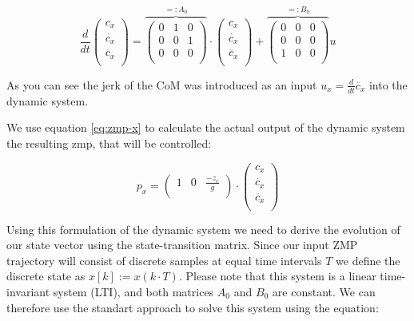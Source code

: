 \documentclass[english,ngerman]{KITreprt}
\begin{document}
\begin{equation} \label{eq:dyn-system}
\frac{d}{dt} \left(\begin{array}{c}
c_x \\
\dot{c_x} \\
\ddot{c_x} \\
\end{array} \right)
=
\overbrace{
\left(\begin{array}{ccc}
0 & 1 & 0\\
0 & 0 & 1 \\
0 & 0 & 0 \\
\end{array}\right)
}^{ =: A_0}
\cdot
\left(\begin{array}{c}
c_x \\
\dot{c_x} \\
\ddot{c_x} \\
\end{array}\right)
+
\overbrace{
\left(\begin{array}{ccc}
0 & 0 & 0\\
0 & 0 & 0\\
1 & 0 & 0\\
\end{array}\right)
}^{ =: B_0}
u
\end{equation}

As you can see the jerk of the CoM was introduced as an input
$u_x = \frac{d}{dt} \ddot{c_x}$ into the dynamic system.

We use equation \ref{eq:zmp-x} to calculate the actual output of the
dynamic system the resulting zmp, that will be controlled:

\begin{equation} \label{eq:zmp-x-output}
p_x =
\left(\begin{array}{ccc}
1 & 0 & \frac{-z_c}{g} \\
\end{array}\right)
\cdot
\left(\begin{array}{c}
c_x \\
\dot{c_x} \\
\ddot{c_x} \\
\end{array}\right)
\end{equation}

Using this formulation of the dynamic system we need to derive the
evolution of our state vector using the state-transition matrix. Since
our input ZMP trajectory will consist of discrete samples at equal time
intervals $T$ we define the discrete state as $x[k] := x(k \cdot T)$.
Please note that this system is a linear time-invariant system (LTI),
and both matrices $A_0$ and $B_0$ are constant. We can therefore use the
standart approach to solve this system using the equation:
\end{document}
